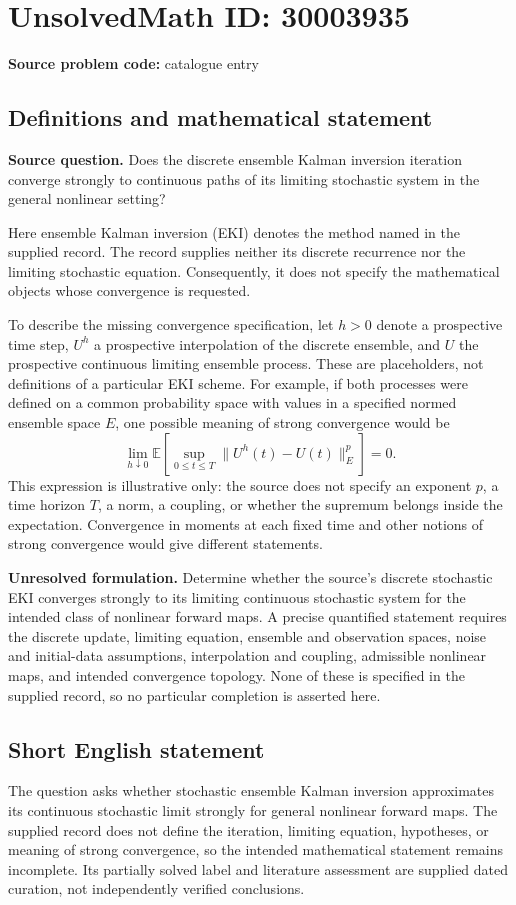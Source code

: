 \documentclass[11pt]{article}
\begin{document}
\section*{UnsolvedMath ID: 30003935}
\textbf{Source problem code:} catalogue entry
\subsection{Definitions and mathematical statement}
\textbf{Source question.} Does the discrete ensemble Kalman inversion iteration converge strongly to continuous paths of its limiting stochastic system in the general nonlinear setting?

Here ensemble Kalman inversion (EKI) denotes the method named in the supplied record. The record supplies neither its discrete recurrence nor the limiting stochastic equation. Consequently, it does not specify the mathematical objects whose convergence is requested.

To describe the missing convergence specification, let \(h>0\) denote a prospective time step, \(U^h\) a prospective interpolation of the discrete ensemble, and \(U\) the prospective continuous limiting ensemble process. These are placeholders, not definitions of a particular EKI scheme. For example, if both processes were defined on a common probability space with values in a specified normed ensemble space \(E\), one possible meaning of strong convergence would be
\[
\lim_{h\downarrow0}\mathbb{E}\!\left[\sup_{0\leq t\leq T}\|U^h(t)-U(t)\|_E^p\right]=0.
\]
This expression is illustrative only: the source does not specify an exponent \(p\), a time horizon \(T\), a norm, a coupling, or whether the supremum belongs inside the expectation. Convergence in moments at each fixed time and other notions of strong convergence would give different statements.

\textbf{Unresolved formulation.} Determine whether the source's discrete stochastic EKI converges strongly to its limiting continuous stochastic system for the intended class of nonlinear forward maps. A precise quantified statement requires the discrete update, limiting equation, ensemble and observation spaces, noise and initial-data assumptions, interpolation and coupling, admissible nonlinear maps, and intended convergence topology. None of these is specified in the supplied record, so no particular completion is asserted here.
\subsection{Short English statement}
The question asks whether stochastic ensemble Kalman inversion approximates its continuous stochastic limit strongly for general nonlinear forward maps. The supplied record does not define the iteration, limiting equation, hypotheses, or meaning of strong convergence, so the intended mathematical statement remains incomplete. Its partially solved label and literature assessment are supplied dated curation, not independently verified conclusions.
\end{document}
